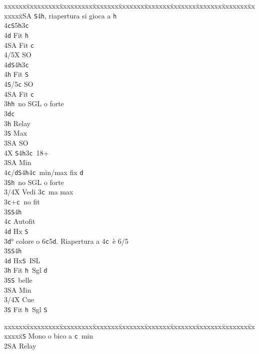 \documentclass[a4paper,italian]{article}
\newcommand{\BS}{\small{\texttt{S}}}
\newcommand{\BC}{\small{\texttt{c}}}
\newcommand{\BD}{\small{\texttt{d}}}
\newcommand{\BH}{\small{\texttt{h}}}
\newenvironment{bidtable}
{\begin{tabbing}

    xxxxxx\=xxxxxxxxx\=xxxxxxxxx\=xxxxxxx\=xxxxxxx\=xxxxxxx\=xxxxxxx\=xxxxxxx\=xxxxxxx\=xxxxxxx\=\kill}
{\end{tabbing} }%
\begin{document}
\begin{multicols}{2}
\begin{bidtable}
        3\small{SA} \BS 4\BH , riapertura si gioca a \BH \\
        4\BC {}\BS5\BH3\BC \+\\
        4\BD \> Fit \BH\\
        4\small{SA} \> Fit \BC\\
        4/5X \> SO\-\\
        4\BD {}\BS 4\BH 3\BC\+\\
        4\BH \> Fit \BS\\
        4\BS/5\BC \> SO\\
        4\small{SA} \> Fit \BC\-\-\\
        3\BH {}\BH\ no SGL o forte\-\\
        3\BD {}\BC \+\\
        3\BH \> Relay\+\\
        3\BS \> Max\+\\
        3\small{SA} \> SO\+\\
        4X \BS 4\BH 3\BC\ 18+\-\-\\
        3\small{SA} \> Min\\
        4\BC/\BD {}\BS 4\BH 4\BC\ min/max fix \BD \-\\
        3\BS {}\BH\ no SGL o forte\-\\
        3/4X \> Vedi 3\BC\ ma max\-\\
        3\BC {}+\BC\ no fit\+\\
        3\BS {}\BS 4\BH \+\\
        4\BC \> Autofit\\
        4\BD \> Hx \BS \-\-\\
        3\BD {}° colore o 6\BC 5\BD . Riapertura a 4\BC\ è 6/5\+\\
        3\BS {}\BS4\BH\+\\
        4\BD \> Hx\BS\ ISL\-\-\\
        3\BH \> Fit \BH\ Sgl \BD \+\\
        3\BS {}\BS\ belle\\
        3\small{SA} \> Min\\
        3/4X \> Cue\-\\
        3\BS \> Fit \BH\ Sgl \BS \-\\
    \end{bidtable}
    \columnbreak
    \begin{bidtable}
        2\BS \> Mono o bico a \BC\ min\+\\
        2\small{SA} \> Relay\+\\

\end{bidtable}
\end{multicols}
\end{document}
